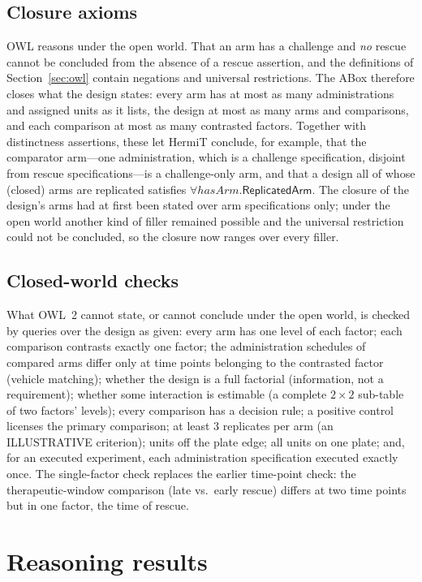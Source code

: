 \documentclass[10pt,a4paper]{article}
\begin{document}
\subsection{Closure axioms}
OWL reasons under the open world. That an arm has a challenge and \emph{no} rescue cannot be concluded from the absence
of a rescue assertion, and the definitions of Section~\ref{sec:owl} contain negations and universal restrictions. The
ABox therefore closes what the design states: every arm has at most as many administrations and assigned units as it
lists, the design at most as many arms and comparisons, and each comparison at most as many contrasted factors.
Together with distinctness assertions, these let HermiT conclude, for example, that the comparator arm---one
administration, which is a challenge specification, disjoint from rescue specifications---is a challenge-only arm, and
that a design all of whose (closed) arms are replicated satisfies $\forall \mathit{hasArm}.\mathsf{ReplicatedArm}$.
The closure of the design's arms had at first been stated over arm specifications only; under the open world another
kind of filler remained possible and the universal restriction could not be concluded, so the closure now ranges over
every filler.

\subsection{Closed-world checks}
What OWL~2 cannot state, or cannot conclude under the open world, is checked by queries over the design as given:
every arm has one level of each factor; each comparison contrasts exactly one factor; the administration schedules of
compared arms differ only at time points belonging to the contrasted factor (vehicle matching); whether the design is a
full factorial (information, not a requirement); whether some interaction is estimable (a complete $2\times2$
sub-table of two factors' levels); every comparison has a decision rule; a positive control licenses the primary
comparison; at least 3 replicates per arm (an ILLUSTRATIVE criterion); units off the plate edge; all units
on one plate; and, for an executed experiment, each administration specification executed exactly once. The
single-factor check replaces the earlier time-point check: the therapeutic-window comparison (late vs.\ early rescue)
differs at two time points but in one factor, the time of rescue.


\section{Reasoning results}\label{sec:results}
\end{document}
